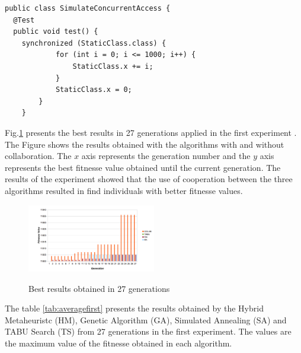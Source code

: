 
\begin{lstlisting}[style=outline,caption={SimulateConcurrentAcess class},float,label=classsimulated]
public class SimulateConcurrentAccess {
  @Test
  public void test() {		
    synchronized (StaticClass.class) {
			for (int i = 0; i <= 1000; i++) {
				StaticClass.x += i;
			}
			StaticClass.x = 0;
		}
	}
\end{lstlisting}


Fig.\ref{fig:exp1bestresults} presents the best results in 27 generations applied in the first experiment . The Figure shows the results obtained with the algorithms with and without collaboration. The $x$ axis  represents the generation number and the $y$ axis represents the best fitnesse value obtained until the current generation. The results of the experiment showed that the use of cooperation between the three algorithms resulted in find individuals with better fitnesse values.

\begin{figure}[h]
\centering
\caption{Best results obtained in 27 generations}
\includegraphics[width=0.5\textwidth]{./images/generationcomparative.png}
\label{fig:exp1bestresults}
\end{figure}
The table \ref{tab:averagefirst} presents the results obtained by the Hybrid Metaheuristc (HM), Genetic Algorithm (GA), Simulated Annealing (SA) and TABU Search (TS) from 27 generations in the first experiment. The values are the maximum value of the fitnesse obtained in each algorithm. 

